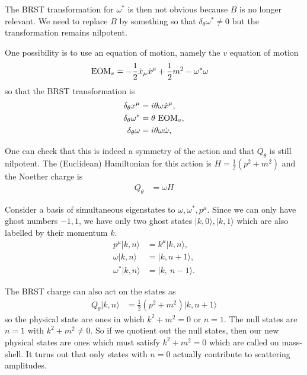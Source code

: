 \documentclass[notitlepage,amsmath,amssymb,aps, pra, 10pt]{revtex4-1}
\begin{document}
    The BRST transformation for $\omega^*$ is then not obvious because $B$ is no longer relevant. We need to replace $B$ by something so that $\delta_{\theta} \omega ^* \neq 0 $ but the transformation remains nilpotent.

    One possibility is to use an equation of motion, namely the $v$ equation of motion
    \begin{align}
        {\rm EOM}_{v} &= -\frac{1}{2} \dot x_{\mu} \dot x^{\mu} + \frac{1}{2}m^2 - \omega^* \omega
    \end{align}
    so that the BRST transformation is
    \begin{align}
    \delta_{\theta}x^{\mu} &= i \theta\omega \dot x^{\mu},\\
    \delta_{\theta}\omega^* &=  \theta \ {\rm EOM}_{v},\\
    \delta_{\theta}\omega &= i \theta\omega \dot \omega,\\
    \end{align}

    One can check that this is indeed a symmetry of the action and that $Q_{\theta}$ is still nilpotent. The (Euclidean) Hamiltonian for this action is $H = \frac{1}{2} ( p^2 + m^2) $ and the Noether charge is
    \begin{align}
        Q_{\theta} &= \omega H
    \end{align}

    Consider a basis of simultaneous eigenstates to $\omega, \omega ^*, p^{\mu}$. Since we can only have ghost numbers $-1, 1$, we have only two ghost states $| k, 0\rangle, | k, 1 \rangle$ which are also labelled by their momentum $k$.
    \begin{align}
      p^{\mu} | k, n \rangle &= k^{\mu} | k,  n \rangle,\\
      \omega | k, n \rangle &=  | k,  n+1 \rangle,\\
      \omega^*| k, n \rangle &= | k, \ n-1 \rangle.
    \end{align}

    The BRST charge can also act on the states as
    \begin{align}
        Q_{\theta} | k, n \rangle &=\frac{1}{2} ( p^2 + m^2)  | k, n +1 \rangle
    \end{align}
    so the physical state are ones in which $k^2 + m^2 = 0 $ or $ n = 1$. The null states are $n = 1$ with $k^2 + m^2 \neq 0 $. So if we quotient out the null states, then our new physical states are ones which must satisfy $k^2 + m^2 = 0$ which are called on mass-shell. It turns out that only states with $n=0$ actually contribute to scattering amplitudes.
\end{document}
